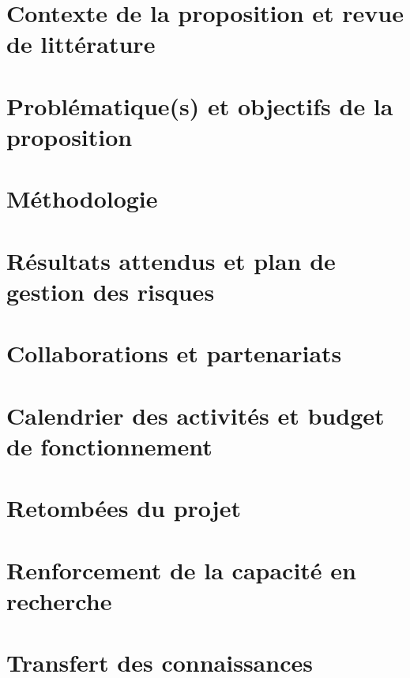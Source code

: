 \documentclass{fqr}
\renewcommand{\nombreDePages}{7}
\renewcommand{\titreDocument}{Description de projet -- recherche collégiale}
\begin{document}
\section{Contexte de la proposition et revue de littérature}

\cite{Bergeron2021}


\section{Problématique\hspace{1pt}(s) et objectifs de la proposition}
\section{Méthodologie}
\section{Résultats attendus et plan de gestion des risques}
\section{Collaborations et partenariats}
\section{Calendrier des activités et budget de fonctionnement}
\section{Retombées du projet}
\section{Renforcement de la capacité en recherche}
\section{Transfert des connaissances}

\pagebreak

\setcounter{page}{1}
\renewcommand{\nombreDePages}{1}
\renewcommand{\section}[2]{}
\renewcommand{\titreDocument}{Bibliographie}

\printbibliography{}
\end{document}
